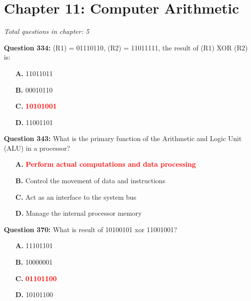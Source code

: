\documentclass[12pt,a4paper]{article}
\begin{document}
\vspace{0.5cm}

\vspace{0.5cm}

\section{Chapter 11: Computer Arithmetic}
\textit{Total questions in chapter: 5}

\textbf{Question 334:} (R1) = 01110110, (R2) = 11011111, the result of (R1) XOR (R2) is:

\begin{itemize}
    \item[\textbf{A.}] 11011011
    \item[\textbf{B.}] 00010110
    \item[\textbf{C.}] \textcolor{red}{\textbf{10101001}}
    \item[\textbf{D.}] 11001101
\end{itemize}

\vspace{0.5cm}

\vspace{0.5cm}

\textbf{Question 343:} What is the primary function of the Arithmetic and Logic Unit (ALU) in a processor?

\begin{itemize}
    \item[\textbf{A.}] \textcolor{red}{\textbf{Perform actual computations and data processing}}
    \item[\textbf{B.}] Control the movement of data and instructions
    \item[\textbf{C.}] Act as an interface to the system bus
    \item[\textbf{D.}] Manage the internal processor memory
\end{itemize}

\vspace{0.5cm}

\vspace{0.5cm}

\textbf{Question 370:} What is result of 10100101 xor 11001001?

\begin{itemize}
    \item[\textbf{A.}] 11101101
    \item[\textbf{B.}] 10000001
    \item[\textbf{C.}] \textcolor{red}{\textbf{01101100}}
    \item[\textbf{D.}] 10101100
\end{itemize}
\end{document}
